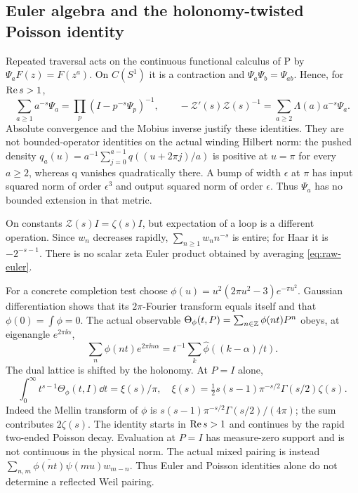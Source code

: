 \subsection{Euler algebra and the holonomy-twisted Poisson identity}
Repeated traversal acts on the continuous functional calculus of P by
$\Psi_aF(z)=F(z^a)$. On $C(S^1)$ it is a contraction and
$\Psi_a\Psi_b=\Psi_{ab}$. Hence, for $\operatorname{Re} s>1$,
\begin{equation}\label{eq:raw-euler}
\sum_{a\ge1}a^{-s}\Psi_a=\prod_p(I-p^{-s}\Psi_p)^{-1},\qquad
-\mathcal Z'(s)\mathcal Z(s)^{-1}
=\sum_{a\ge2}\Lambda(a)a^{-s}\Psi_a.
\end{equation}
Absolute convergence and the Mobius inverse justify these identities.
They are not bounded-operator identities on the actual winding
Hilbert norm: the pushed density
$q_a(u)=a^{-1}\sum_{j=0}^{a-1}q((u+2\pi j)/a)$ is positive at $u=\pi$
for every $a\ge2$, whereas q vanishes quadratically there. A bump of
width $\epsilon$ at $\pi$ has input squared norm of order $\epsilon^3$
and output squared norm of order $\epsilon$. Thus $\Psi_a$ has no
bounded extension in that metric.

On constants $\mathcal Z(s)I=\zeta(s)I$, but expectation of a loop is
a different operation. Since $w_n$ decreases rapidly,
$\sum_{n\ge1}w_n n^{-s}$ is entire; for Haar it is $-2^{-s-1}$.
There is no scalar zeta Euler product obtained by averaging
\eqref{eq:raw-euler}.

For a concrete completion test choose
$\phi(u)=u^2(2\pi u^2-3)e^{-\pi u^2}$.
Gaussian differentiation shows that its $2\pi$-Fourier transform equals
itself and that $\phi(0)=\int\phi=0$. The actual observable
$\Theta_\phi(t,P)=\sum_{n\in\mathbb Z}\phi(nt)P^n$ obeys, at eigenangle
$e^{2\pi\ii\alpha}$,
\begin{equation}
\sum_n\phi(nt)e^{2\pi\ii n\alpha}
=t^{-1}\sum_k\widehat\phi((k-\alpha)/t).
\end{equation}
The dual lattice is shifted by the holonomy. At $P=I$ alone,
\begin{equation}
\int_0^\infty t^{s-1}\Theta_\phi(t,I)\dd t
=\xi(s)/\pi,
\quad \xi(s)=\tfrac12s(s-1)\pi^{-s/2}\Gamma(s/2)\zeta(s).
\end{equation}
Indeed the Mellin transform of $\phi$ is
$s(s-1)\pi^{-s/2}\Gamma(s/2)/(4\pi)$; the sum contributes $2\zeta(s)$.
The identity starts in $\operatorname{Re} s>1$ and continues by the rapid two-ended
Poisson decay. Evaluation at $P=I$ has measure-zero support and is not
continuous in the physical \Ltwo{} norm. The actual mixed pairing is instead
$\sum_{n,m}\overline{\phi(nt)}\psi(mu)w_{m-n}$.
Thus Euler and Poisson identities alone do not determine a reflected
Weil pairing.
